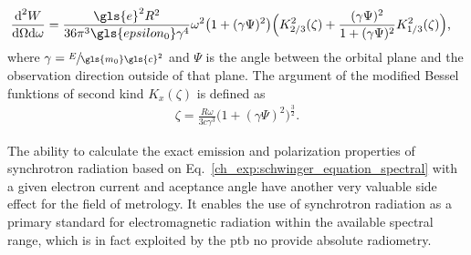 \begin{align}
 \frac{\text{d}^2 W}{\text{d} \Omega \text{d} \omega} &= \frac{\gls{e}^2 R^2}{36 \pi^3 \gls{epsilon_0} \gamma^4} \omega^2 \big(1+ (\gamma \Psi)^2\big)\Big( K_{2/3}^2(\zeta) + \frac{(\gamma \Psi)^2}{1 + (\gamma \Psi)^2} K_{1/3}^2(\zeta)\Big) \text{,} \label{ch_exp:schwinger_equation_spectral}
\end{align}
where $\gamma = \sfrac{E}{\gls{m_0} \gls{c}^2}$ and $\Psi$ is the angle between the orbital plane and the observation direction outside of that plane. The argument of the modified Bessel funktions of second kind $K_{x}(\zeta)$ is defined as
\begin{align}
 \zeta = \frac{R \omega}{3 c \gamma^3} \big(1 + (\gamma \Psi)^2\big)^\frac{3}{2} \text{.}
\end{align}


The ability to calculate the exact emission and polarization properties of synchrotron radiation based on Eq.~\eqref{ch_exp:schwinger_equation_spectral} with a given electron current and aceptance angle have another very valuable side effect for the field of metrology. It enables the use of synchrotron radiation as a primary standard for electromagnetic radiation within the available spectral range, which is in fact exploited by the \gls{ptb} \cite{thornagel_electron_2001} no provide absolute radiometry.

